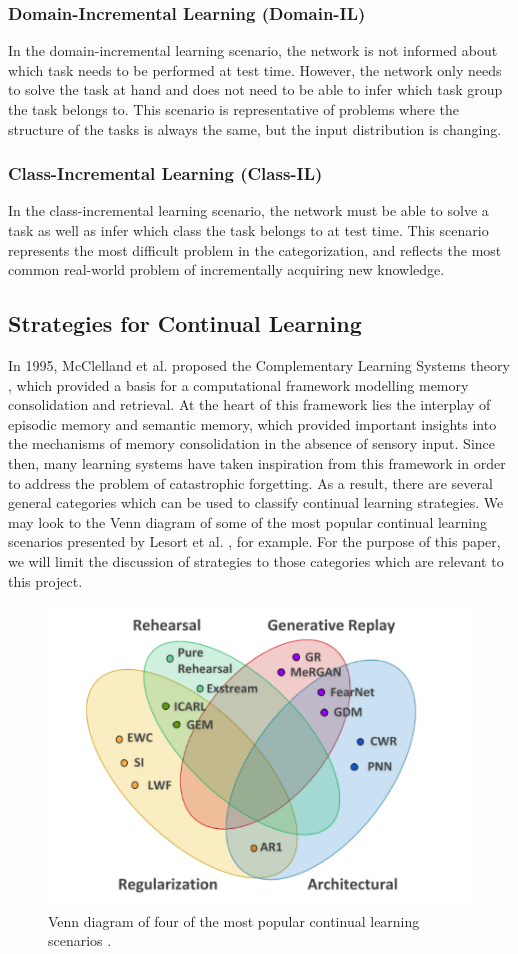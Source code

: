 \documentclass{article}
\begin{document}
\subsubsection{Domain-Incremental Learning (Domain-IL)}
In the domain-incremental learning scenario, the network is not informed about which task needs to be performed at test time. However, the network only needs to solve the task at hand and does not need to be able to infer which task group the task belongs to. This scenario is representative of problems where the structure of the tasks is always the same, but the input distribution is changing.

\subsubsection{Class-Incremental Learning (Class-IL)}
In the class-incremental learning scenario, the network must be able to solve a task as well as infer which class the task belongs to at test time. This scenario represents the most difficult problem in the categorization, and reflects the most common real-world problem of incrementally acquiring new knowledge. 

\subsection{Strategies for Continual Learning} \label{CL_stratgies}
In 1995, McClelland et al. proposed the Complementary Learning Systems theory \cite{mcclelland1995there}, which provided a basis for a computational framework modelling memory consolidation and retrieval. At the heart of this framework lies the interplay of episodic memory and semantic memory, which provided important insights into the mechanisms of memory consolidation in the absence of sensory input. Since then, many learning systems have taken inspiration from this framework in order to address the problem of catastrophic forgetting. As a result, there are several general categories which can be used to classify continual learning strategies. We may look to the Venn diagram of some of the most popular continual learning scenarios presented by Lesort et al. \cite{lesort2020continual}, for example. For the purpose of this paper, we will limit the discussion of strategies to those categories which are relevant to this project.

\begin{figure}[h]
	\centering
    \includegraphics[width=0.60\linewidth]{CL_strategies_venn_diagram}
    \caption{Venn diagram of four of the most popular continual learning scenarios \cite{lesort2020continual}.}
	\label{fig:CL_strategies_venn_diagram}
\end{figure}
\end{document}

